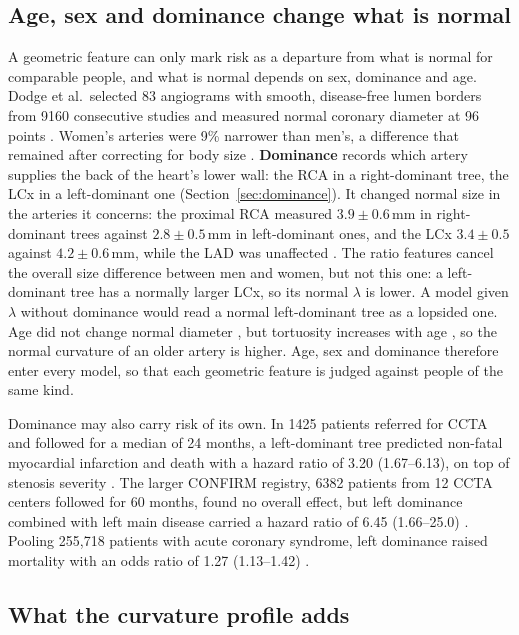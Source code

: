 \subsection{Age, sex and dominance change what is normal}

A geometric feature can only mark risk as a departure from what is normal for comparable people, and what is normal depends on sex, dominance and age.
Dodge et al.\ selected 83 angiograms with smooth, disease-free lumen borders from 9160 consecutive studies and measured normal coronary diameter at 96 points \cite{dodge1992diameter}.
Women's arteries were 9\% narrower than men's, a difference that remained after correcting for body size \cite{dodge1992diameter}.
\textbf{Dominance} records which artery supplies the back of the heart's lower wall: the RCA in a right-dominant tree, the LCx in a left-dominant one (Section~\ref{sec:dominance}).
It changed normal size in the arteries it concerns: the proximal RCA measured $3.9 \pm 0.6$\,mm in right-dominant trees against $2.8 \pm 0.5$\,mm in left-dominant ones, and the LCx $3.4 \pm 0.5$ against $4.2 \pm 0.6$\,mm, while the LAD was unaffected \cite{dodge1992diameter}.
The ratio features cancel the overall size difference between men and women, but not this one: a left-dominant tree has a normally larger LCx, so its normal $\lambda$ is lower.
A model given $\lambda$ without dominance would read a normal left-dominant tree as a lopsided one.
Age did not change normal diameter \cite{dodge1992diameter}, but tortuosity increases with age \cite{kahe2020tortuosity}, so the normal curvature of an older artery is higher.
Age, sex and dominance therefore enter every model, so that each geometric feature is judged against people of the same kind.

Dominance may also carry risk of its own.
In 1425 patients referred for CCTA and followed for a median of 24 months, a left-dominant tree predicted non-fatal myocardial infarction and death with a hazard ratio of 3.20 (1.67--6.13), on top of stenosis severity \cite{veltman2012dominance}.
The larger CONFIRM registry, 6382 patients from 12 CCTA centers followed for 60 months, found no overall effect, but left dominance combined with left main disease carried a hazard ratio of 6.45 (1.66--25.0) \cite{gebhard2015dominance}.
Pooling 255{,}718 patients with acute coronary syndrome, left dominance raised mortality with an odds ratio of 1.27 (1.13--1.42) \cite{khan2016dominance}.

\subsection{What the curvature profile adds}
\label{sec:risk-profile}

